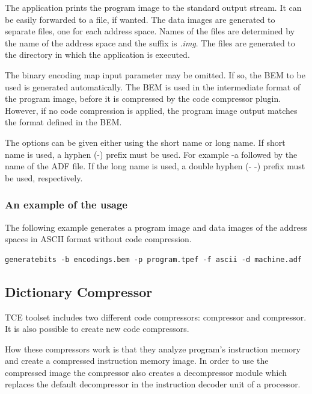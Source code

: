 \documentclass[a4paper,twoside]{tceusermanual}
\begin{document}
The application prints the program image to the standard output
stream. It can be easily forwarded to a file, if wanted. The data
images are generated to separate files, one for each address
space. Names of the files are determined by the name of the address
space and the suffix is \emph{.img}. The files are generated to 
the directory in which the application is executed.

The binary encoding map input parameter may be omitted. If so, the BEM
to be used is generated automatically. The BEM is used in the
intermediate format of the program image, before it is compressed by
the code compressor plugin. However, if no code compression is
applied, the program image output matches the format defined in the
BEM.

The options can be given either using the short name or long name. If
short name is used, a hyphen (-) prefix must be used. For example -a
followed by the name of the ADF file. If the long name is used, a
double hyphen (- -) prefix must be used, respectively.

\subsubsection{An example of the usage}

The following example generates a program image and data images of the address
spaces in ASCII format without code compression.

\begin{verbatim}
generatebits -b encodings.bem -p program.tpef -f ascii -d machine.adf
\end{verbatim}

\subsection{Dictionary Compressor}

TCE toolset includes two different code compressors: 
compressor and  compressor. It is also possible to
create new code compressors.

How these compressors work is that they analyze program's instruction memory and
create a compressed instruction memory image. In order to use the compressed
image the compressor also creates a decompressor module which replaces the
default decompressor in the instruction decoder unit of a processor.
\end{document}
